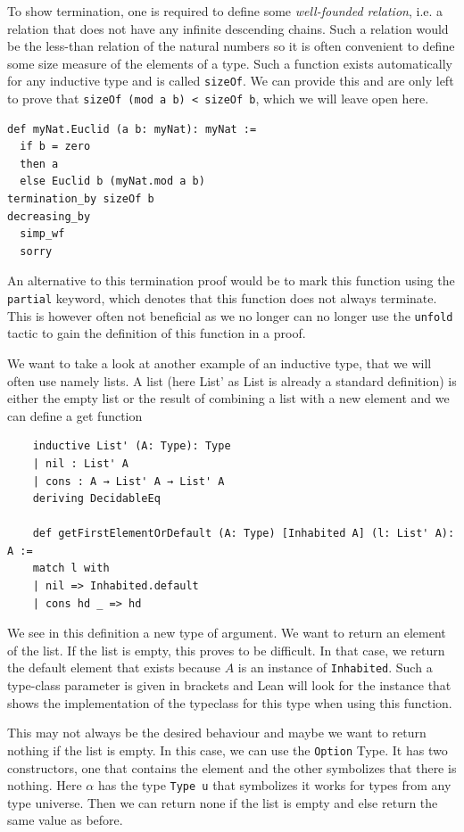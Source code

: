 To show termination, one is required to define some \textit{well-founded relation}, i.e. a relation that does not have any infinite descending chains. Such a relation would be the less-than relation of the natural numbers so it is often convenient to define some size measure of the elements of a type. Such a function exists automatically for any inductive type and is called \lstinline|sizeOf|. We can provide this and are only left to prove that \lstinline|sizeOf (mod a b) < sizeOf b|, which we will leave open here.

\begin{lstlisting}
def myNat.Euclid (a b: myNat): myNat :=
  if b = zero
  then a
  else Euclid b (myNat.mod a b)
termination_by sizeOf b
decreasing_by
  simp_wf
  sorry
\end{lstlisting}

An alternative to this termination proof would be to mark this function using the \lstinline|partial| keyword, which denotes that this function does not always terminate. This is however often not beneficial as we no longer can no longer use the \lstinline|unfold| tactic to gain the definition of this function in a proof.



We want to take a look at another example of an inductive type, that we will often use namely lists. A list (here List' as List is already a standard definition) is either the empty list or the result of combining a list with a new element and we can define a get function

\begin{lstlisting}
    inductive List' (A: Type): Type
    | nil : List' A
    | cons : A → List' A → List' A
    deriving DecidableEq

    def getFirstElementOrDefault (A: Type) [Inhabited A] (l: List' A): A :=
    match l with
    | nil => Inhabited.default
    | cons hd _ => hd
\end{lstlisting}

We see in this definition a new type of argument. We want to return an element of the list. If the list is empty, this proves to be difficult. In that case, we return the default element that exists because $A$ is an instance of \lstinline|Inhabited|. Such a type-class parameter is given in brackets and Lean will look for the instance that shows the implementation of the typeclass for this type when using this function.

This may not always be the desired behaviour and maybe we want to return nothing if the list is empty. In this case, we can use the \lstinline|Option| Type. It has two constructors, one that contains the element and the other symbolizes that there is nothing. Here $\alpha$ has the type \lstinline|Type u| that symbolizes it works for types from any type universe. Then we can return none if the list is empty and else return the same value as before.

